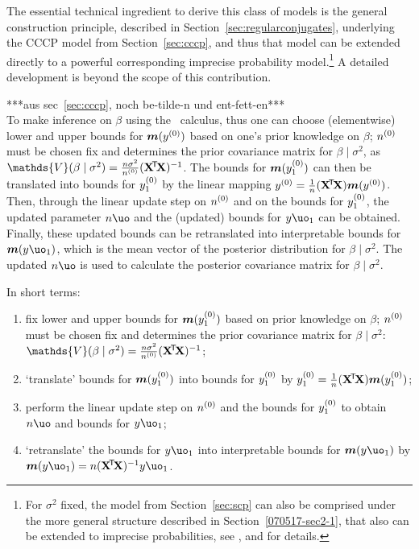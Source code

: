 The essential technical ingredient to derive this class of models is the general construction principle,
described in Section~\ref{sec:regularconjugates},
underlying the CCCP model from Section~\ref{sec:cccp}, and thus that model can be extended directly to
a powerful corresponding imprecise probability model.\footnote{For $\sigma^2$ fixed, the model from
Section~\ref{sec:scp} can also be comprised under the more general structure described in Section~\ref{070517-sec2-1},
that also can be extended to imprecise probabilities, see \textcite{Walter2007a}, and \textcite{Walter2006a} for details.}
A detailed development is beyond the scope of this contribution. %

\iffalse
***aus sec~\ref{sec:cccp}, noch be-tilde-n und ent-fett-en***\\
To make inference on $\beta$ using the \nymodel\ calculus, thus one can choose (elementwise) lower
and upper bounds for $\boldsymbol{m}(y^{(0)})$ based on one's prior knowledge on $\beta$; $n^{(0)}$ must be chosen fix and
determines the prior covariance matrix for $\beta\mid\sigma^2$, as $\mathds{V}(\beta\mid\sigma^2) = \frac{n\sigma^2}{n\uz}(\XtX)^{-1}$.
The bounds for $\boldsymbol{m}(y^{(0)}_1)$ can then be translated into bounds for $y^{(0)}_1$ by the linear
mapping $y^{(0)} = \frac{1}{n}(\mathbf{X}^{{\mbox{\!\scriptsize\textsf{T}}}} \! \mathbf{X}) \boldsymbol{m}(y^{(0)})$.
Then, through the linear update step on $n^{(0)}$ and on the bounds for
$y^{(0)}_1$, the updated parameter $n\uo$ and the (updated) bounds for $y\uo_1$ can be obtained.
Finally, these updated bounds can be retranslated into interpretable bounds for $\bs{m}(y\uo_1)$, which is
the mean vector of the posterior distribution for $\beta\mid\sigma^2$. The updated $n\uo$ is used to calculate the
posterior covariance matrix for $\beta\mid\sigma^2$.

In short terms:
\begin{enumerate}
\item fix lower and upper bounds for $\boldsymbol{m}(y^{(0)}_1)$ based on prior
knowledge on $\beta$; $n^{(0)}$ must be chosen fix %
and determines the prior covariance matrix for $\beta\mid\sigma^2$:
$\mathds{V}(\beta\mid\sigma^2) = \frac{n\sigma^2}{n\uz}(\XtX)^{-1}$;
\item `translate' bounds for $\boldsymbol{m}(y^{(0)}_1)$ into bounds for $y^{(0)}_1$ by
$y^{(0)}_1 = \frac{1}{n}(\mathbf{X}^{{\mbox{\!\scriptsize\textsf{T}}}} \! \mathbf{X}) \boldsymbol{m}(y^{(0)}_1)$;
\item perform the linear update step on $n^{(0)}$ and the bounds for
$y^{(0)}_1$ to obtain $n\uo$ and bounds for $y\uo_1$;
\item `retranslate' the bounds for $y\uo_1$ into interpretable
bounds for $\bs{m}(y\uo_1)$ by $\bs{m}(y\uo_1) = n (\XtX)^{-1} y\uo_1$.
\end{enumerate}

